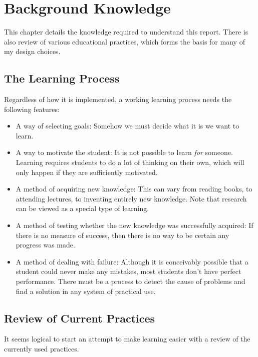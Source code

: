 \chapter{Background Knowledge}
\label{chapter:background}
  This chapter details the knowledge required to understand this report. There is also review of various educational practices, which forms the basis for many of my design choices.

  \section{The Learning Process}
    Regardless of how it is implemented, a working learning process needs the following features:

    \begin{itemize}
      \item A way of selecting goals: Somehow we must decide what it is we want to learn.

      \item A way to motivate the student: It is not possible to learn \emph{for} someone. Learning requires students to do a lot of thinking on their own, which will only happen if they are sufficiently motivated.

      \item A method of acquiring new knowledge: This can vary from reading books, to attending lectures, to inventing entirely new knowledge. Note that research can be viewed as a special type of learning.

      \item A method of testing whether the new knowledge was successfully acquired: If there is no measure of success, then there is no way to be certain any progress was made.

      \item A method of dealing with failure: Although it is conceivably possible that a student could never make any mistakes, most students don't have perfect performance. There must be a process to detect the cause of problems and find a solution in any system of practical use.
    \end{itemize}

  \section{Review of Current Practices}
    It seems logical to start an attempt to make learning easier with a review of the currently used practices.

